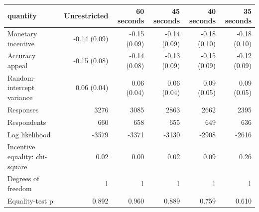 \begin{tabular}{lrrrrr}
\toprule
quantity & Unrestricted & 60 seconds & 45 seconds & 40 seconds & 35 seconds \\
\midrule
Monetary incentive & -0.14 (0.09) & -0.15 (0.09) & -0.14 (0.09) & -0.18 (0.10) & -0.18 (0.10) \\
Accuracy appeal & -0.15 (0.08) & -0.14 (0.08) & -0.13 (0.09) & -0.15 (0.09) & -0.12 (0.09) \\
Random-intercept variance & 0.06 (0.04) & 0.06 (0.04) & 0.06 (0.04) & 0.09 (0.05) & 0.09 (0.05) \\
Responses & 3276 & 3085 & 2863 & 2662 & 2395 \\
Respondents & 660 & 658 & 655 & 649 & 636 \\
Log likelihood & -3579 & -3371 & -3130 & -2908 & -2616 \\
Incentive equality: chi-square & 0.02 & 0.00 & 0.02 & 0.09 & 0.26 \\
Degrees of freedom & 1 & 1 & 1 & 1 & 1 \\
Equality-test p & 0.892 & 0.960 & 0.889 & 0.759 & 0.610 \\
\bottomrule
\end{tabular}
